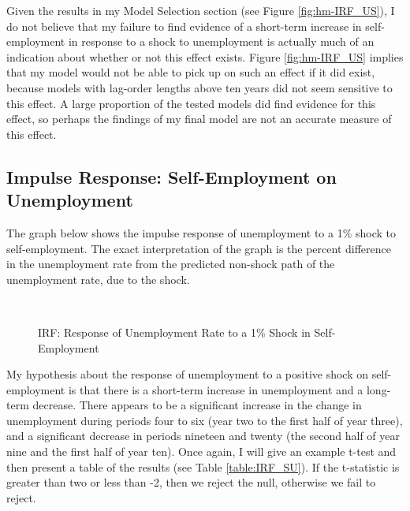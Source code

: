 \documentclass[]{ecca}
\begin{document}
Given the results in my Model Selection section (see Figure \ref{fig:hm-IRF_US}), I do not believe that my failure to find evidence of a short-term increase in self-employment in response to a shock to unemployment is actually much of an indication about whether or not this effect exists. Figure \ref{fig:hm-IRF_US} implies that my model would not be able to pick up on such an effect if it did exist, because models with lag-order lengths above ten years did not seem sensitive to this effect. A large proportion of the tested models did find evidence for this effect, so perhaps the findings of my final model are not an accurate measure of this effect.

\subsection{Impulse Response: Self-Employment on Unemployment}

The graph below shows the impulse response of unemployment to a 1\% shock to self-employment. The exact interpretation of the graph is the percent difference in the unemployment rate from the predicted non-shock path of the unemployment rate, due to the shock.

\begin{figure}[!h]
	\centering
	\medskip\\
	\caption{IRF: Response of Unemployment Rate to a 1\% Shock in Self-Employment }
	\label{fig:IRF_SU}
\end{figure}

My hypothesis about the response of unemployment to a positive shock on self-employment is that there is a short-term increase in unemployment and a long-term decrease. There appears to be a significant increase in the change in unemployment during periods four to six (year two to the first half of year three), and a significant decrease in periods nineteen and twenty (the second half of year nine and the first half of year ten). Once again, I will give an example t-test and then present a table of the results (see Table \ref{table:IRF_SU}). If the t-statistic is greater than two or less than -2, then we reject the null, otherwise we fail to reject.
\end{document}
